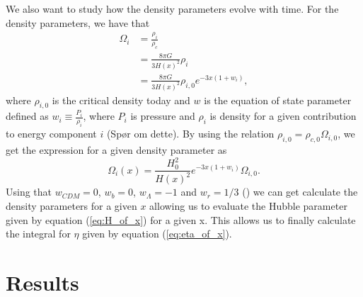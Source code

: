\documentclass[onecolumn]{aastex62}
\begin{document}
We also want to study how the density parameters evolve with time. For the density parameters, we
have that 
\begin{align}
    \Omega_i &= \frac{\rho_i}{\rho_{c}} \\
             &= \frac{8\pi G}{3H(x)^2}\rho_i\\
             &= \frac{8\pi G}{3H(x)^2}\rho_{i,0}e^{-3x(1+w_i)},
\end{align}
where $\rho_{i,0}$ is the critical density
today and $w$ is the equation of state parameter defined as $w_i\equiv\frac{P_i}{\rho_i}$, where $P_i$ is pressure and
$\rho_i$ is density for a given contribution to energy component $i$ (Spør om
dette). By using the relation $\rho_{i,0} = \rho_{c,0}\Omega_{i,0}$, we get the
expression for a given density parameter as 
\begin{equation}
    \Omega_i(x)=\frac{H_0^2}{H(x)^2}e^{-3x(1+w_i)}\Omega_{i,0}.
\end{equation}
Using that $w_{CDM} = 0$, $w_{b} = 0$, $w_{\Lambda} = -1$ and $w_{r} = 1/3$
(\cite{Winther:2020}) we can get calculate the density parameters for a given
$x$ allowing us to evaluate the Hubble parameter given by equation
(\ref{eq:H_of_x}) for a given x. This allows us to finally calculate the
integral for $\eta$ given by equation (\ref{eq:eta_of_x}).
\section{Results} \label{sec:results}




\end{document}
